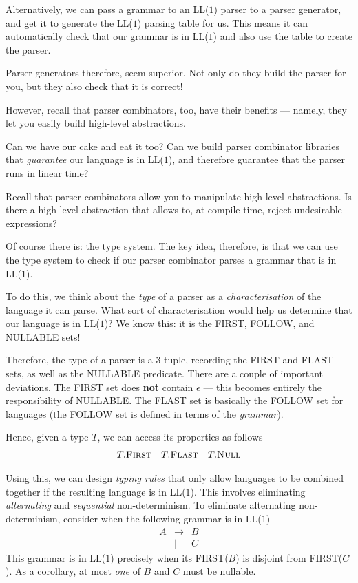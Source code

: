 Alternatively, we can pass a grammar to an LL($1$) parser to a parser generator, and get it to generate the LL($1$) parsing table for us. This means it can automatically check that our grammar is in LL($1$) and also use the table to create the parser.

Parser generators therefore, seem superior. Not only do they build the parser for you, but they also check that it is correct!

However, recall that parser combinators, too, have their benefits --- namely, they let you easily build high-level abstractions.

Can we have our cake and eat it too? Can we build parser combinator libraries that \textit{guarantee} our language is in LL($1$), and therefore guarantee that the parser runs in linear time?

Recall that parser combinators allow you to manipulate high-level abstractions. Is there a high-level abstraction that allows to, at compile time, reject undesirable expressions?

Of course there is: the type system. The key idea, therefore, is that we can use the type system to check if our parser combinator parses a grammar that is in LL($1$). 

To do this, we think about the \textit{type} of a parser as a \textit{characterisation} of the language it can parse. What sort of characterisation would help us determine that our language is in LL($1$)? We know this: it is the \textsf{FIRST}, \textsf{FOLLOW}, and \textsf{NULLABLE} sets!

Therefore, the type of a parser is a 3-tuple, recording the \textsf{FIRST} and \textsf{FLAST} sets, as well as the \textsf{NULLABLE} predicate. There are a couple of important deviations. The \textsf{FIRST} set does \textbf{not} contain $\epsilon$ --- this becomes entirely the responsibility of \textsf{NULLABLE}. The \textsf{FLAST} set is basically the \textsf{FOLLOW} set for languages (the \textsf{FOLLOW} set is defined in terms of the \textit{grammar}).

Hence, given a type $T$, we can access its properties as follows
\[
\begin{array}{ccc}
     T.\textsc{First} & T.\textsc{Flast} & T.\textsc{Null}  \\ 
\end{array}
\]

Using this, we can design \textit{typing rules} that only allow languages to be combined together if the resulting language is in LL($1$). This involves eliminating \textit{alternating} and \textit{sequential} non-determinism. To eliminate alternating non-determinism, consider when the following grammar is in LL($1$)
\[\begin{array}{rcl}
     A&\to&B  \\
     &\mid&C  
\end{array}\]
This grammar is in LL($1$) precisely when its \textsf{FIRST}($B$) is disjoint from \textsf{FIRST}($C$). As a corollary, at most \textit{one} of $B$ and $C$ must be nullable. 

